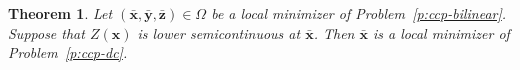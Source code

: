 \documentclass[11pt]{article}
\newtheorem{theorem}{Theorem}[section]
\newtheorem{definition}[theorem]{Definition}
\def\bs{\boldsymbol}
\def\X{\mathcal{X}}
\begin{document}

\begin{theorem}
Let $(\bar{\bs{x}},\bar{\bs{y}},\bar{\bs{z}})\in\Omega$ be a local minimizer of Problem~\eqref{p:ccp-bilinear}. Suppose that $Z(\bs{x})$ is lower semicontinuous at $\bar{\bs{x}}$. Then $\bar{\bs{x}}$ is a local minimizer of Problem~\eqref{p:ccp-dc}.
\end{theorem}
\end{document}
